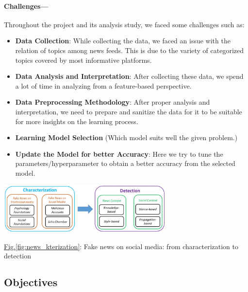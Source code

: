 \documentclass[11.5pt]{article}
\begin{document}
\begin{multicols}{2}
\paragraph{Challenges---}
Throughout the project and its analysis study, we faced some challenges such as:
\begin{itemize}
    \item \textbf{Data Collection}: While collecting the data, we faced an issue with the relation of topics among news feeds. This is due to the variety of categorized topics covered by most informative platforms. 
    \item \textbf{Data Analysis and Interpretation}:
    After collecting these data, we spend a lot of time in analyzing from a feature-based perspective.
    \item \textbf{Data Preprocessing Methodology}:
    After proper analysis and interpretation, we need to prepare and sanitize the data for it to be suitable for more insights on the learning process. 
    \item \textbf{Learning Model Selection}
    (Which model suits well the given problem.)
    \item \textbf{Update the Model for better Accuracy}:
    Here we try to tune the parameters/hyperparameter to obtain a better accuracy from the selected model.
\end{itemize}
\begin{center}
    \centering
    \qquad
    \includegraphics[width=8.8cm]{Fake news on social media -- from characterization to detection.jpg}
    \caption{\underline{Fig.\ref{fig:news_kterization}}: Fake news on social media: from characterization to detection}
    \label{fig:news_kterization}
\end{center}
\subsection{Objectives}

\end{multicols}
\end{document}
